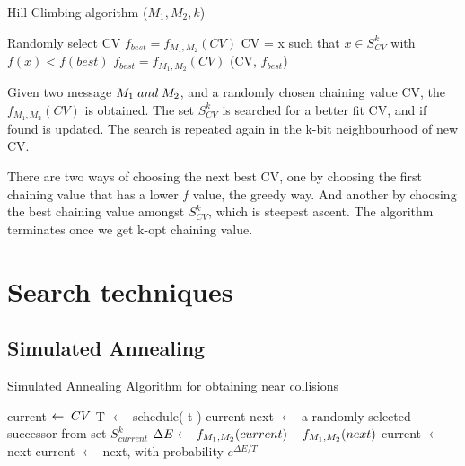 \begin{algorithm}
  \caption{ Hill Climbing algorithm ($M_{1}, M_{2}, k$) \cite{00029}}
  \begin{algorithmic}[1]
    \State Randomly select CV
    \State $f_{best} = f_{M_{1}, M_{2}}(CV)$
    \State {}
    \State CV = x such that $x \in S^{k}_{CV}$ with $f(x) < f(best)$
    \State $f_{best} = f_{M_{1}, M_{2}}(CV)$
    \State \EndWhile
    \State \Return (CV, $f_{best}$)
  \end{algorithmic}
\end{algorithm}

Given two message $M_{1} \thickspace and \thickspace M_{2}$, and a randomly chosen chaining value CV, the $f_{M_{1}, M_{2}}(CV)$
is obtained. The set $S^{k}_{CV}$ is searched for a better fit CV, and if found is updated. The search is repeated again
in the k-bit neighbourhood of new CV.

There are two ways of choosing the next best CV, one by choosing the first chaining value that has a lower $f$ value, the
greedy way. And another by choosing the best chaining value amongst $S^{k}_{CV}$, which is steepest ascent. The algorithm
terminates once we get k-opt chaining value.

\section{Search techniques}

\subsection{Simulated Annealing}

\begin{algorithm}
  \caption{ Simulated Annealing Algorithm for obtaining near collisions }
  \begin{algorithmic}[1]
      \State current $\gets \thickspace CV$
        \State T $\gets$ schedule( t )
          \State \Return current
        \EndIf
        \State next $\gets$ a randomly selected successor from set $S^{k}_{current}$
        \State $\Delta E \gets  \thickspace f_{M_{1}, M_{2}}(current) - f_{M_{1}, M_{2}}(next)$
          \State current $\gets$ next
        \Else
          \State current $\gets$ next, with probability $e^{\Delta E / T}$
        \EndIf
      \EndFor
    \EndFunction
  \end{algorithmic}
\end{algorithm}


